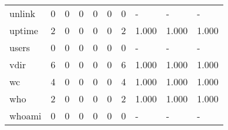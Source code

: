 \begin{longtable}{lp{1.3cm}p{1.3cm}p{1.3cm}p{1.3cm}p{1.3cm}p{1.3cm}p{1.3cm}p{1.3cm}p{1.3cm}}
unlink    &                      0 &                                             0 &                                            0 &                                           0 &                                            0 &                                          0 &                                    - &                                      - &                                    - \\
uptime    &                      2 &                                             0 &                                            0 &                                           0 &                                            0 &                                          2 &                                1.000 &                                  1.000 &                                1.000 \\
users     &                      0 &                                             0 &                                            0 &                                           0 &                                            0 &                                          0 &                                    - &                                      - &                                    - \\
vdir      &                      6 &                                             0 &                                            0 &                                           0 &                                            0 &                                          6 &                                1.000 &                                  1.000 &                                1.000 \\
wc        &                      4 &                                             0 &                                            0 &                                           0 &                                            0 &                                          4 &                                1.000 &                                  1.000 &                                1.000 \\
who       &                      2 &                                             0 &                                            0 &                                           0 &                                            0 &                                          2 &                                1.000 &                                  1.000 &                                1.000 \\
whoami    &                      0 &                                             0 &                                            0 &                                           0 &                                            0 &                                          0 &                                    - &                                      - &                                    - \\

\end{longtable}
